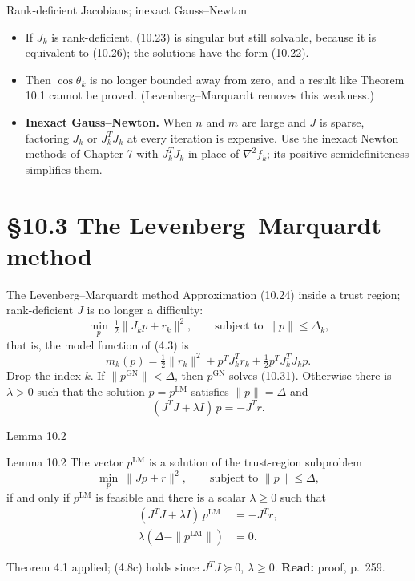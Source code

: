 \documentclass[aspectratio=169,12pt]{beamer}
\newcommand{\hessf}{\nabla^{2} f}
\newcommand{\GN}{\mathrm{GN}}
\newcommand{\LM}{\mathrm{LM}}
\newcommand{\readbook}[1]{{\color{red}\textbf{Read:} #1}}
\begin{document}
\begin{frame}{Rank-deficient Jacobians; inexact Gauss--Newton}
  \begin{itemize}\setlength\itemsep{0.6em}
    \item If $J_{k}$ is rank-deficient, (10.23) is singular but still solvable, because it is
      equivalent to (10.26); the solutions have the form (10.22).
    \item Then $\cos\theta_{k}$ is no longer bounded away from zero, and a result like Theorem 10.1
      cannot be proved. (Levenberg--Marquardt removes this weakness.)
    \item \textbf{Inexact Gauss--Newton.} When $n$ and $m$ are large and $J$ is sparse, factoring $J_{k}$
      or $J_{k}^{T}J_{k}$ at every iteration is expensive. Use the inexact Newton methods of
      Chapter 7 with $J_{k}^{T}J_{k}$ in place of $\hessf_{k}$; its positive semidefiniteness
      simplifies them.
  \end{itemize}
\end{frame}

\section{\S10.3 The Levenberg--Marquardt method}

\begin{frame}{The Levenberg--Marquardt method}
  Approximation (10.24) inside a \alert{trust region}; rank-deficient $J$ is no longer a difficulty:
  \[ \min_{p}\ \tfrac12\|J_{k}p+r_{k}\|^{2},\qquad\text{subject to }\|p\|\le\Delta_{k}, \tag{10.31} \]
  that is, the model function of (4.3) is
  \[ m_{k}(p)=\tfrac12\|r_{k}\|^{2}+p^{T}J_{k}^{T}r_{k}+\tfrac12p^{T}J_{k}^{T}J_{k}p . \tag{10.32} \]
  Drop the index $k$. If $\|p^{\GN}\|<\Delta$, then $p^{\GN}$ solves (10.31). Otherwise there is
  $\lambda>0$ such that the solution $p=p^{\LM}$ satisfies $\|p\|=\Delta$ and
  \[ (J^{T}J+\lambda I)\,p=-J^{T}r . \tag{10.33} \]
\end{frame}

\begin{frame}{Lemma 10.2}
  \begin{block}{Lemma 10.2}
    The vector $p^{\LM}$ is a solution of the trust-region subproblem
    \[ \min_{p}\ \|Jp+r\|^{2},\qquad\text{subject to }\|p\|\le\Delta, \]
    if and only if $p^{\LM}$ is feasible and there is a scalar $\lambda\ge 0$ such that
    \begin{align}
      (J^{T}J+\lambda I)\,p^{\LM}&=-J^{T}r, \tag{10.34a}\\
      \lambda(\Delta-\|p^{\LM}\|)&=0 . \tag{10.34b}
    \end{align}
  \end{block}

  \vspace{0.2em}
  Theorem 4.1 applied; (4.8c) holds since $J^{T}J\succeq 0$, $\lambda\ge 0$. \readbook{proof, p.~259.}
\end{frame}
\end{document}
